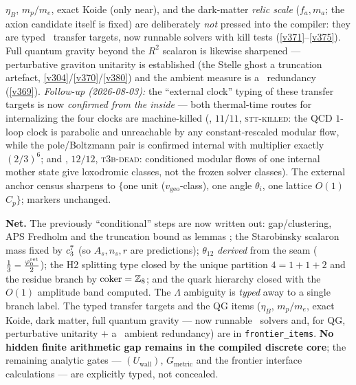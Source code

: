 \begin{gapbox}
$\eta_B$, $m_p/m_e$, exact Koide (only near), and the dark-matter \emph{relic scale} ($f_a,m_a$; the axion
candidate itself is fixed) are deliberately \emph{not} pressed into the compiler: they are typed \mC\ transfer
targets, now runnable solvers with kill tests (\vref{v371}--\vref{v375}). Full quantum gravity beyond the $R^2$
scalaron is likewise sharpened --- perturbative graviton unitarity is established (the Stelle ghost a truncation
artefact, \vref{v304}/\vref{v370}/\vref{v380}) and the ambient measure is a \mC\ redundancy (\vref{v369}).
\emph{Follow-up (2026-08-03):} the ``external clock'' typing of these transfer targets is now
\emph{confirmed from the inside} --- both thermal-time routes for internalizing the four clocks are
machine-killed (, $11/11$, \textsc{stt-killed}: the QCD $1$-loop
clock is parabolic and unreachable by any constant-rescaled modular flow, while the pole/Boltzmann
pair is confirmed internal with multiplier exactly $(2/3)^6$; and
, $12/12$, \textsc{t3b-dead}: conditioned modular flows of
one internal mother state give loxodromic classes, not the frozen solver classes).  The external
anchor census sharpens to $\{$one unit ($v_{\mathrm{geo}}$-class), one angle $\theta_i$, one lattice
$O(1)$ $C_p\}$; markers unchanged.
\end{gapbox}

\noindent\textbf{Net.} The previously ``conditional'' steps are now written out: gap/clustering, APS
Fredholm and the truncation bound as lemmas \mE; the Starobinsky scalaron mass fixed by $c_3^7$ (so
$A_s,n_s,r$ are predictions); $\theta_{12}$ \emph{derived} from the seam ($\tfrac13-\tfrac{\varphi_0^{\mathrm{ret}}}{2}$);
the H2 splitting type closed by the unique partition $4{=}1{+}1{+}2$ and the residue branch by
$\operatorname{coker}=\mathbb{Z}_8$; and the quark hierarchy closed with the $O(1)$ amplitude band computed. The
$\Lambda$ ambiguity is \emph{typed} away to a single branch label. The typed transfer targets and the QG items
($\eta_B$, $m_p/m_e$, exact Koide, dark matter, full quantum gravity --- now runnable \mC\ solvers and, for QG,
perturbative unitarity $+$ a \mC\ ambient redundancy) are in \texttt{frontier\_items}.
\textbf{No hidden finite arithmetic gap remains in the compiled discrete core}; the remaining analytic gates
--- $(U_{\mathrm{wall}})$, $G_{\mathrm{metric}}$ and the frontier interface calculations --- are explicitly
typed, not concealed.


